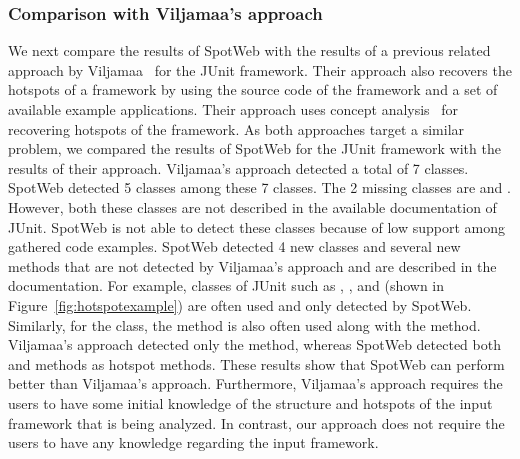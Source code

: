 \subsubsection{Comparison with Viljamaa's approach}
We next compare the results of SpotWeb with the results of a previous related approach by Viljamaa~\cite{viljamaa:reverse}
for the JUnit framework. Their approach also recovers the hotspots of a framework
by using the source code of the framework and a set of available example applications. Their approach
uses concept analysis~\cite{ganter:concept} for recovering hotspots of the framework. As both approaches target
a similar problem, we compared the results of SpotWeb for the JUnit framework with the
results of their approach. Viljamaa's approach detected a total of 7 classes. 
SpotWeb detected 5 classes among these 7 classes. The 2 missing classes
are  and . However, both
these classes are not described in the available documentation of JUnit.
SpotWeb is not able to detect these classes because of low 
support among gathered code examples. SpotWeb detected 4 new classes and several
new methods that are not detected by Viljamaa's approach and are described in the documentation. 
For example, classes of JUnit such as , ,
and  (shown in Figure~\ref{fig:hotspotexample}) 
are often used and only detected by SpotWeb. Similarly, for the
 class, the  method is also often used along with
the  method. Viljamaa's approach detected only the  method, whereas
SpotWeb detected both  and  methods as hotspot methods.
These results show that SpotWeb can perform better than Viljamaa's approach.
Furthermore, Viljamaa's approach requires the users to have 
some initial knowledge of the structure and hotspots of the input framework that is being analyzed.
In contrast, our approach does not require the users to have any knowledge regarding the 
input framework.


